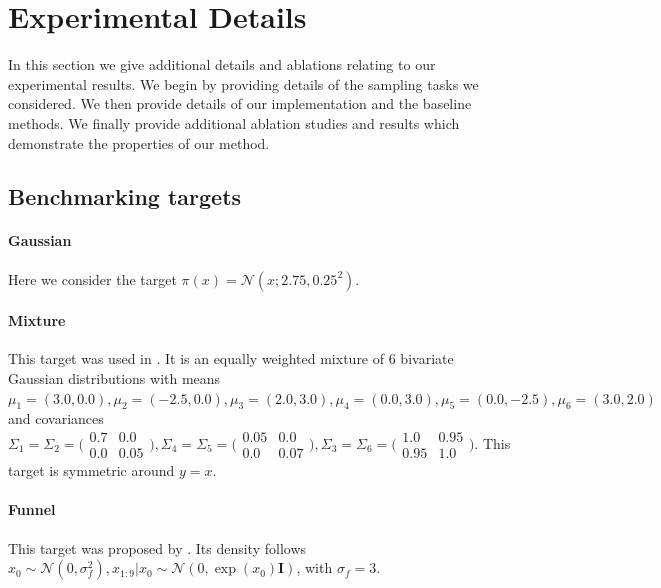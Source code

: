 \documentclass{article}
\theoremstyle{plain}
\theoremstyle{definition}
\theoremstyle{remark}
\begin{document}
\section{Experimental Details}
\label{apx:experimental}

In this section we give additional details and ablations relating to our experimental results. We begin by providing details of the sampling tasks we considered. We then provide details of our implementation and the baseline methods. We finally provide additional ablation studies and results which demonstrate the properties of our method.

\subsection{Benchmarking targets}
\label{apx:exp_tasks}

\paragraph{Gaussian}
Here we consider the target $\pi(x) = \mathcal{N}(x; 2.75, 0.25^2)$.

\paragraph{Mixture} This target was used in \citet{arbel2021annealed}. It is an equally weighted mixture of 6 bivariate Gaussian distributions with means $\mu_1=(3.0,0.0), \mu_2=(-2.5, 0.0), \mu_3=(2.0, 3.0), \mu_4=(0.0, 3.0), \mu_5=(0.0, -2.5), \mu_6=(3.0,2.0)$ and covariances $\Sigma_1=\Sigma_2=\big(\begin{smallmatrix}
			0.7 & 0.0\\
			0.0 & 0.05
		\end{smallmatrix}\big), \Sigma_4=\Sigma_5=\big(\begin{smallmatrix}
			0.05 & 0.0\\
			0.0 & 0.07
		\end{smallmatrix}\big), \Sigma_3=\Sigma_6=\big(\begin{smallmatrix}
			1.0 & 0.95\\
			0.95 & 1.0
		\end{smallmatrix}\big)$. This target is symmetric around $y=x$.

\paragraph{Funnel} This target was proposed by \citet{Neal:2003}. Its density follows $x_0 \sim \mathcal{N}(0, \sigma_f^2), x_{1:9}|x_0 \sim \mathcal{N}(0, \exp(x_0)\mathbf{I})$, with $\sigma_f=3$.
\end{document}

